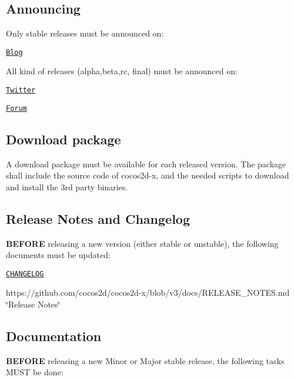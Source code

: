 \subsection*{Announcing}

Only stable releases must be announced on\+:


\begin{DoxyItemize}
\item \href{http://www.cocos2d-x.org/news}{\tt Blog}
\end{DoxyItemize}

All kind of releases (alpha,beta,rc, final) must be announced on\+:
\begin{DoxyItemize}
\item \href{https://twitter.com/cocos2dx}{\tt Twitter}
\item \href{http://discuss.cocos2d-x.org/}{\tt Forum}
\end{DoxyItemize}

\subsection*{Download package}

A download package must be available for each released version. The package shall include the source code of cocos2d-\/x, and the needed scripts to download and install the 3rd party binaries.

\subsection*{Release Notes and Changelog}

{\bfseries B\+E\+F\+O\+RE} releasing a new version (either stable or unstable), the following documents must be updated\+:


\begin{DoxyItemize}
\item \href{https://github.com/cocos2d/cocos2d-x/blob/v3/CHANGELOG}{\tt C\+H\+A\+N\+G\+E\+L\+OG}
\item https\+://github.com/cocos2d/cocos2d-\/x/blob/v3/docs/\+R\+E\+L\+E\+A\+S\+E\+\_\+\+N\+O\+T\+E\+S.\+md \char`\"{}\+Release Notes\char`\"{}
\end{DoxyItemize}

\subsection*{Documentation}

{\bfseries B\+E\+F\+O\+RE} releasing a new Minor or Major stable release, the following tasks M\+U\+ST be done\+:


